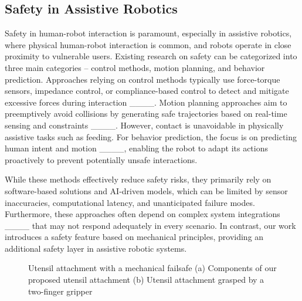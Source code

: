 


\subsection{Safety in Assistive Robotics}
Safety in human-robot interaction is paramount, especially in assistive robotics, where physical human-robot interaction is common, and robots operate in close proximity to vulnerable users. Existing research on safety can be categorized into three main categories -- control methods, motion planning, and behavior prediction. Approaches relying on control methods typically use force-torque sensors, impedance control, or compliance-based control to detect and mitigate excessive forces during interaction ____. Motion planning approaches aim to preemptively avoid collisions by generating safe trajectories based on real-time sensing and constraints ____. However, contact is unavoidable in physically assistive tasks such as feeding. For behavior prediction, the focus is on predicting human intent and motion ____, enabling the robot to adapt its actions proactively to prevent potentially unsafe interactions.

While these methods effectively reduce safety risks, they primarily rely on software-based solutions and AI-driven models, which can be limited by sensor inaccuracies, computational latency, and unanticipated failure modes. Furthermore, these approaches often depend on complex system integrations ____ that may not respond adequately in every scenario. In contrast, our work introduces a safety feature based on mechanical principles, providing an additional safety layer in assistive robotic systems.

\begin{figure}[t]
    \centering
    \hfill
    \caption{Utensil attachment with a mechanical failsafe (a) Components of our proposed utensil attachment (b) Utensil attachment grasped by a two-finger gripper}
\end{figure}